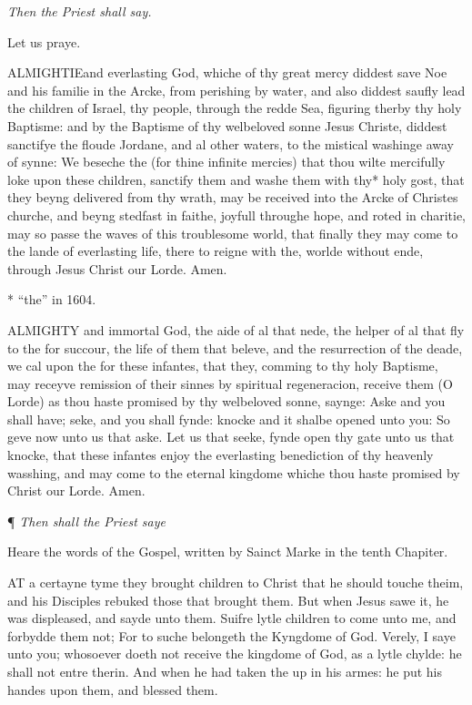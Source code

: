 \emph{Then
the Priest shall say.}

Let
us praye.

ALMIGHTIE\textbf{}and everlasting God, whiche of thy great mercy diddest save Noe and
his familie in the Arcke, from perishing by water, and also diddest saufly
lead the children of Israel, thy people, through the redde Sea, figuring
therby thy holy Baptisme: and by the Baptisme of thy welbeloved sonne
Jesus Christe, diddest sanctifye the floude Jordane, and al other waters,
to the mistical washinge away of synne: We beseche the (for thine infinite
mercies) that thou wilte mercifully loke upon these children, sanctify
them and washe them with thy* holy gost, that they beyng delivered from
thy wrath, may be received into the Arcke of Christes churche, and beyng
stedfast in faithe, joyfull throughe hope, and roted in charitie, may
so passe the waves of this troublesome world, that finally they may come
to the lande of everlasting life, there to reigne with the, worlde without
ende, through Jesus Christ our Lorde. Amen.

*
``the''
in 1604.

ALMIGHTY
and immortal God, the aide of al that nede, the helper of al that fly
to the for succour, the life of them that beleve, and the resurrection
of the deade, we cal upon the for these infantes, that they, comming to
thy holy Baptisme, may receyve remission of their sinnes by spiritual
regeneracion, receive them (O Lorde) as thou haste promised by thy welbeloved
sonne, saynge: Aske and you shall have; seke, and you shall fynde: knocke
and it shalbe opened unto you: So geve now unto us that aske. Let us that
seeke, fynde open thy gate unto us that knocke, that these infantes enjoy
the everlasting benediction of thy heavenly wasshing, and may come to
the eternal kingdome whiche thou haste promised by Christ our Lorde. Amen.

¶
\emph{Then shall the Priest saye}

Heare the words of the Gospel, written by Sainct Marke in the tenth Chapiter.

AT
a certayne tyme they brought children to Christ that he should touche
theim, and his Disciples rebuked those that brought them. But when Jesus
sawe it, he was displeased, and sayde unto them. Suifre lytle children
to come unto me, and forbydde them not; For to suche belongeth the Kyngdome
of God. Verely, I saye unto you; whosoever doeth not receive the kingdome
of God, as a lytle chylde: he shall not entre therin. And when he had
taken the up in his armes: he put his handes upon them, and blessed them.

